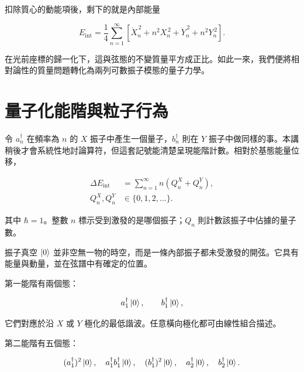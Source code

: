 扣除質心的動能項後，剩下的就是內部能量

\begin{equation}
  E_{\mathrm{int}}
  =
  \frac14
  \sum_{n=1}^{\infty}
  \left[
    \dot X_n^{\,2}+n^2X_n^{\,2}
    +\dot Y_n^{\,2}+n^2Y_n^{\,2}
  \right].
  \label{eq:l02-internal-energy}
\end{equation}

在光前座標的歸一化下，這與弦態的不變質量平方成正比。如此一來，我們便將相對論性的質量問題轉化為兩列可數振子模態的量子力學。

\section{量子化能階與粒子行為}

令 \(a_n^\dagger\) 在頻率為 \(n\) 的 \(X\) 振子中產生一個量子，\(b_n^\dagger\) 則在 \(Y\) 振子中做同樣的事。本講稍後才會系統性地討論算符，但這套記號能清楚呈現能階計數。相對於基態能量位移，

\begin{equation}
  \begin{aligned}
    \Delta E_{\mathrm{int}}
    &=\sum_{n=1}^{\infty}n\left(Q_n^X+Q_n^Y\right),\\
    Q_n^X,Q_n^Y&\in\{0,1,2,\ldots\}.
  \end{aligned}
  \label{eq:l02-quantized-energy}
\end{equation}

其中 \(\hbar=1\)。整數 \(n\) 標示受到激發的是哪個振子；\(Q_n\) 則計數該振子中佔據的量子數。

振子真空 \(\left\lvert0\right\rangle\) 並非空無一物的時空，而是一條內部振子都未受激發的開弦。它具有能量與動量，並在弦譜中有確定的位置。

第一能階有兩個態：

\begin{equation}
  a_1^\dagger\left\lvert0\right\rangle,
  \qquad
  b_1^\dagger\left\lvert0\right\rangle,
  \label{eq:l02-level-one}
\end{equation}

它們對應於沿 \(X\) 或 \(Y\) 極化的最低諧波。任意橫向極化都可由線性組合描述。

第二能階有五個態：

\begin{equation}
  (a_1^\dagger)^2\left\lvert0\right\rangle,
  \quad
  a_1^\dagger b_1^\dagger\left\lvert0\right\rangle,
  \quad
  (b_1^\dagger)^2\left\lvert0\right\rangle,
  \quad
  a_2^\dagger\left\lvert0\right\rangle,
  \quad
  b_2^\dagger\left\lvert0\right\rangle.
  \label{eq:l02-level-two}
\end{equation}

